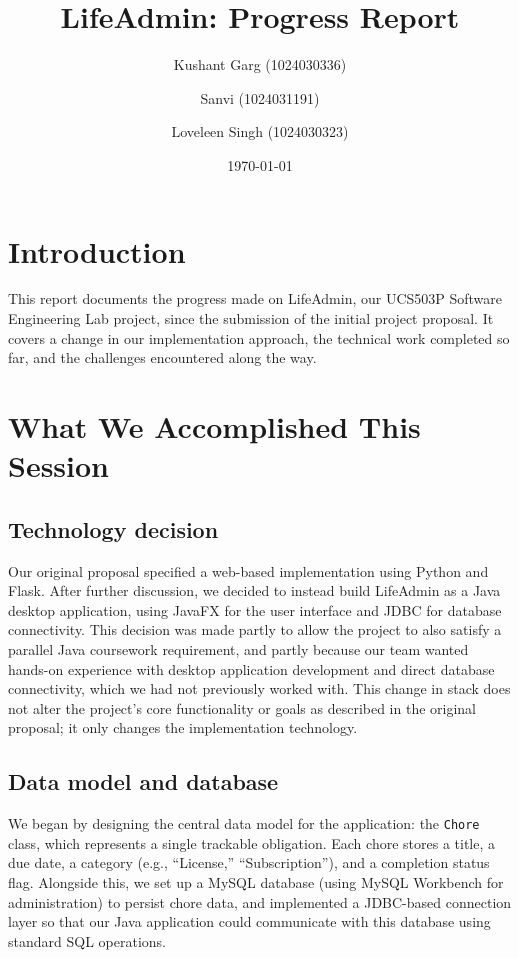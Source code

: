 \documentclass[11pt,a4paper]{article}
\title{LifeAdmin: Progress Report}
\author{Kushant Garg (1024030336) \and Sanvi (1024031191) \and Loveleen Singh (1024030323)}
\date{\today}
\begin{document}
\maketitle

\section{Introduction}
This report documents the progress made on LifeAdmin, our UCS503P Software Engineering Lab project, since the submission of the initial project proposal. It covers a change in our implementation approach, the technical work completed so far, and the challenges encountered along the way.

\section{What We Accomplished This Session}

\subsection{Technology decision}
Our original proposal specified a web-based implementation using Python and Flask. After further discussion, we decided to instead build LifeAdmin as a Java desktop application, using JavaFX for the user interface and JDBC for database connectivity. This decision was made partly to allow the project to also satisfy a parallel Java coursework requirement, and partly because our team wanted hands-on experience with desktop application development and direct database connectivity, which we had not previously worked with. This change in stack does not alter the project's core functionality or goals as described in the original proposal; it only changes the implementation technology.

\subsection{Data model and database}
We began by designing the central data model for the application: the \texttt{Chore} class, which represents a single trackable obligation. Each chore stores a title, a due date, a category (e.g., ``License,'' ``Subscription''), and a completion status flag. Alongside this, we set up a MySQL database (using MySQL Workbench for administration) to persist chore data, and implemented a JDBC-based connection layer so that our Java application could communicate with this database using standard SQL operations.
\end{document}
